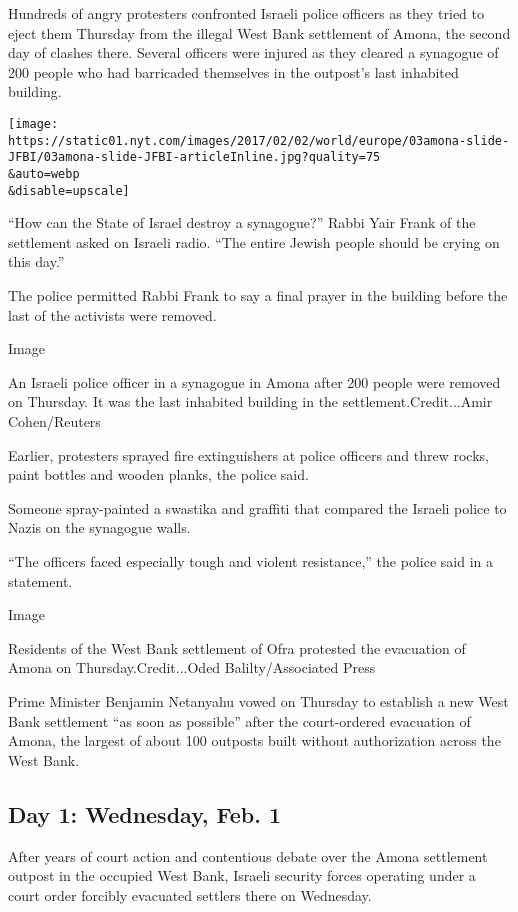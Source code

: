 Hundreds of angry protesters confronted Israeli police officers as they
tried to eject them Thursday from the illegal West Bank settlement of
Amona, the second day of clashes there. Several officers were injured as
they cleared a synagogue of 200 people who had barricaded themselves in
the outpost's last inhabited building.

\texttt{[image: https://static01.nyt.com/images/2017/02/02/world/europe/03amona-slide-JFBI/03amona-slide-JFBI-articleInline.jpg?quality=75\\\&auto=webp\\\&disable=upscale]}

``How can the State of Israel destroy a synagogue?'' Rabbi Yair Frank of
the settlement asked on Israeli radio. ``The entire Jewish people should
be crying on this day.''

The police permitted Rabbi Frank to say a final prayer in the building
before the last of the activists were removed.

Image

An Israeli police officer in a synagogue in Amona after 200 people were
removed on Thursday. It was the last inhabited building in the
settlement.Credit...Amir Cohen/Reuters

Earlier, protesters sprayed fire extinguishers at police officers and
threw rocks, paint bottles and wooden planks, the police said.

Someone spray-painted a swastika and graffiti that compared the Israeli
police to Nazis on the synagogue walls.

``The officers faced especially tough and violent resistance,'' the
police said in a statement.

Image

Residents of the West Bank settlement of Ofra protested the evacuation
of Amona on Thursday.Credit...Oded Balilty/Associated Press

Prime Minister Benjamin Netanyahu vowed on Thursday to establish a new
West Bank settlement ``as soon as possible'' after the court-ordered
evacuation of Amona, the largest of about 100 outposts built without
authorization across the West Bank.

\hypertarget{day-1-wednesday-feb-1}{%
\subsection{Day 1: Wednesday, Feb. 1}\label{day-1-wednesday-feb-1}}

After years of court action and contentious debate over the Amona
settlement outpost in the occupied West Bank, Israeli security forces
operating under a court order forcibly evacuated settlers there on
Wednesday.

